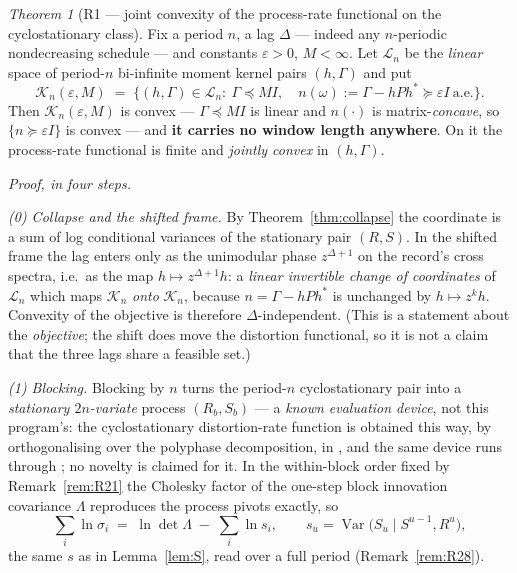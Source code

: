 \documentclass[11pt]{article}
\theoremstyle{definition}
\theoremstyle{remark}
\newtheorem{namedthm}{Theorem}
\begin{document}
\begin{namedthm}[R1 --- joint convexity of the process-rate functional
on the cyclostationary class]
\label{lem:R1}
Fix a period $n$, a lag $\Delta$ --- indeed any $n$-periodic
nondecreasing schedule --- and constants $\varepsilon>0$,
$M<\infty$. Let $\mathcal L_n$ be the \emph{linear} space of period-$n$
bi-infinite moment kernel pairs $(h,\Gamma)$ and put
\[
\mathcal K_n(\varepsilon,M)\;=\;\bigl\{(h,\Gamma)\in\mathcal L_n:\
\Gamma\preceq M I,\quad
n(\omega):=\Gamma-hPh^\ast\succeq\varepsilon I\ \text{a.e.}\bigr\}.
\]
Then $\mathcal K_n(\varepsilon,M)$ is convex --- $\Gamma\preceq MI$ is
linear and $n(\cdot)$ is matrix-\emph{concave}, so
$\{n\succeq\varepsilon I\}$ is convex --- and \textbf{it carries no
window length anywhere}. On it the process-rate functional is finite
and \emph{jointly convex} in $(h,\Gamma)$.
\end{namedthm}

\noindent\emph{Proof, in four steps.}

\emph{(0) Collapse and the shifted frame.} By
Theorem~\ref{thm:collapse} the coordinate is a sum of log conditional
variances of the stationary pair $(R,S)$. In the shifted frame the lag
enters only as the unimodular phase $z^{\Delta+1}$ on the record's
cross spectra, i.e.\ as the map $h\mapsto z^{\Delta+1}h$: a
\emph{linear invertible change of coordinates} of $\mathcal L_n$ which
maps $\mathcal K_n$ \emph{onto} $\mathcal K_n$, because
$n=\Gamma-hPh^\ast$ is unchanged by $h\mapsto z^kh$. Convexity of the
objective is therefore $\Delta$-independent. (This is a statement about
the \emph{objective}; the shift does move the distortion functional, so
it is not a claim that the three lags share a feasible set.)

\emph{(1) Blocking.} Blocking by $n$ turns the period-$n$
cyclostationary pair into a \emph{stationary $2n$-variate} process
$(R_b,S_b)$ --- a \emph{known evaluation device}, not this program's:
the cyclostationary distortion-rate function is obtained this way, by
orthogonalising over the polyphase decomposition, in
\cite{bib:kge18}, and the same device runs through
\cite{bib:asd20,bib:tdp24,bib:tdp25}; no novelty is claimed for it.
In the within-block order fixed by
Remark~\ref{rem:R21} the Cholesky factor of the one-step block
innovation covariance $\Lambda$ reproduces the process pivots exactly,
so
\[
\sum_{i}\ln\sigma_i\;=\;\ln\det\Lambda\;-\;\sum_i\ln s_i ,
\qquad
s_u=\operatorname{Var}\bigl(S_u\mid S^{u-1},R^{u}\bigr),
\]
the same $s$ as in Lemma~\ref{lem:S}, read over a full period
(Remark~\ref{rem:R28}).
\end{document}
